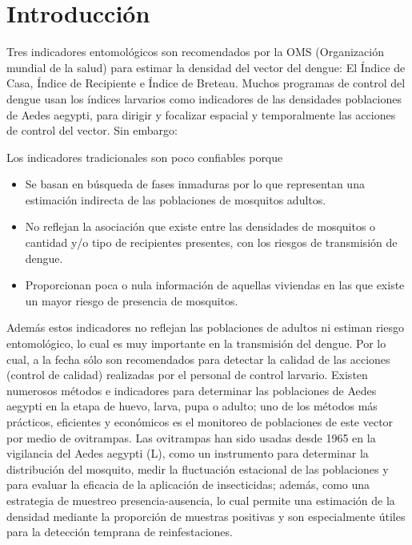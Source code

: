 \section{Introducción}
\label{sec:densidad-vectorial-introduccion}

Tres indicadores entomológicos son recomendados por la OMS (Organización
mundial de la salud) para estimar la densidad del vector del dengue: El
Índice de Casa, Índice de Recipiente e Índice de Breteau. Muchos
programas de control del dengue usan los índices larvarios como indicadores
de las densidades poblaciones de Aedes aegypti, para dirigir y focalizar
espacial y temporalmente las acciones de control del vector. Sin embargo:

Los indicadores tradicionales son poco confiables porque
\begin{itemize}
    \item Se basan en búsqueda de fases inmaduras por lo que representan
        una estimación indirecta de las poblaciones de mosquitos adultos.
    \item No reflejan la asociación que existe entre las densidades de
        mosquitos o cantidad y/o tipo de recipientes presentes, con los
        riesgos de transmisión de dengue.
    \item Proporcionan poca o nula información de aquellas viviendas en
        las que existe un mayor riesgo de presencia de mosquitos.
\end{itemize}

Además estos indicadores no reflejan las poblaciones de adultos ni estiman
riesgo entomológico, lo cual es muy importante en la transmisión del dengue.
Por lo cual, a la fecha sólo son recomendados para detectar la calidad de
las acciones (control de calidad) realizadas por el personal de control
larvario. Existen numerosos métodos e indicadores para determinar las
poblaciones de Aedes aegypti en la etapa de huevo, larva, pupa o adulto;
uno de los métodos más prácticos, eficientes y económicos es el monitoreo
de poblaciones de este vector por medio de ovitrampas. Las ovitrampas han
sido usadas desde 1965 en la vigilancia del Aedes aegypti (L), como un
instrumento para determinar la distribución del mosquito, medir la fluctuación
estacional de las poblaciones y para evaluar la eficacia de la aplicación
de insecticidas; además, como una estrategia de muestreo presencia-ausencia,
lo cual permite una estimación de la densidad mediante la proporción de
muestras positivas y son especialmente útiles para la detección temprana
de reinfestaciones. \cite{cenaprece2013}

